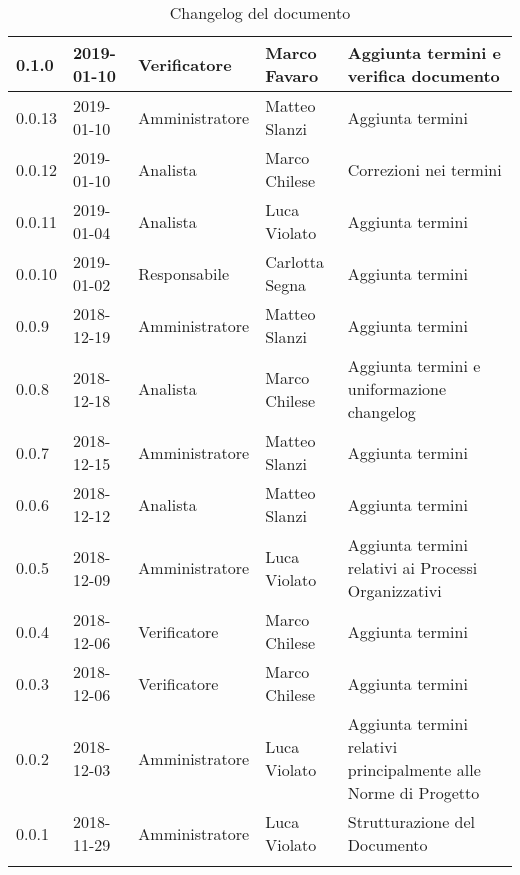 \begin{center}
\begin{longtable}[c]{|m{}|m{}|m{}|m{}|p{}|}
\hline
\rowcolor{grigio}0.1.0 & 2019-01-10 & Verificatore & Marco Favaro & Aggiunta termini e verifica documento\\
\hline
0.0.13 & 2019-01-10 & Amministratore & Matteo Slanzi & Aggiunta termini\\
\hline
\rowcolor{grigio}0.0.12 & 2019-01-10 & Analista & Marco Chilese & Correzioni nei termini\\
\hline
0.0.11 & 2019-01-04 & Analista & Luca Violato & Aggiunta termini\\
\hline
\rowcolor{grigio} 0.0.10 & 2019-01-02 & Responsabile & Carlotta Segna & Aggiunta termini\\
\hline
0.0.9 & 2018-12-19 & Amministratore & Matteo Slanzi & Aggiunta termini\\
\hline
\rowcolor{grigio}0.0.8 & 2018-12-18 & Analista & Marco Chilese & Aggiunta termini e uniformazione changelog\\
\hline
0.0.7 & 2018-12-15 & Amministratore & Matteo Slanzi & Aggiunta termini\\
\hline
\rowcolor{grigio}0.0.6 & 2018-12-12 & Analista & Matteo Slanzi & Aggiunta termini\\
\hline
0.0.5 & 2018-12-09 & Amministratore & Luca Violato & Aggiunta termini relativi ai Processi Organizzativi\\
\hline
\rowcolor{grigio}0.0.4 & 2018-12-06 & Verificatore & Marco Chilese & Aggiunta termini\\
\hline 
0.0.3 & 2018-12-06 & Verificatore  & Marco Chilese & Aggiunta termini\\
\hline
\rowcolor{grigio}0.0.2 & 2018-12-03 & Amministratore & Luca Violato & Aggiunta termini relativi principalmente alle Norme di Progetto \\
\hline
0.0.1 & 2018-11-29  & Amministratore & Luca Violato & Strutturazione del Documento \\
\hline
\caption{Changelog del documento}
\end{longtable}
\end{center}